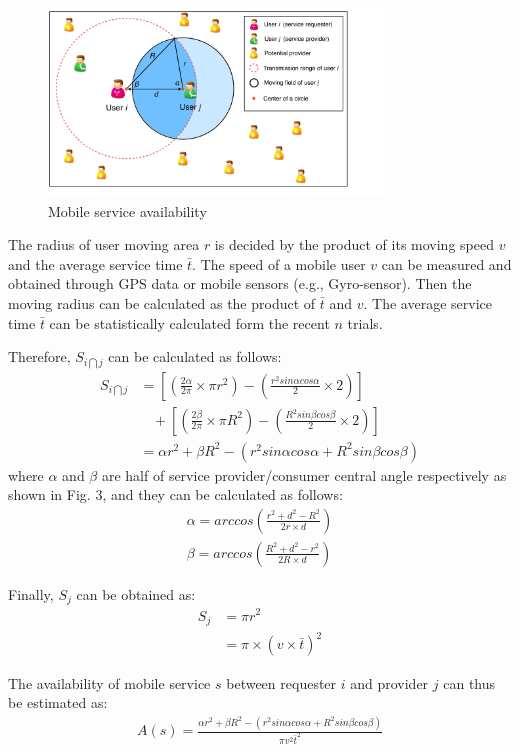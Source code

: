 \documentclass[journal]{IEEEtran}
\begin{document}
\begin{figure}[!t]
\centering
\includegraphics[width=3.5in]{./img/pic3.pdf}
\caption{Mobile service availability}
\label{fig_sd}
\end{figure}

The radius of user moving area $r$ is decided by the product of its moving speed $v$ and the average service time $\bar{t}$. 
The speed of a mobile user $v$ can be measured and obtained through GPS data or mobile sensors (e.g., Gyro-sensor). Then the moving radius can be calculated as the product of $\bar{t}$ and $v$.
The average service time $\bar{t}$ can be statistically calculated form the recent $n$ trials.

Therefore, $S_{i \bigcap j}$ can be calculated as follows:
\begin{align}
S_{i \bigcap j} & =  [(\frac{2\alpha}{2\pi} \times \pi r^2)-(\frac{r^2 sin\alpha cos\alpha}{2} \times 2)]\\\nonumber
& \ \ \ \ +[(\frac{2\beta}{2\pi} \times \pi R^2)-(\frac{R^2 sin\beta cos\beta}{2} \times 2)]\\\nonumber
& = \alpha r^2 + \beta R^2 - (r^2 sin\alpha cos\alpha + R^2 sin\beta cos\beta)
\end{align}
where $\alpha$ and $\beta$ are half of service provider/consumer central angle respectively as shown in Fig. 3, and they can be calculated as follows:
\begin{eqnarray}
\alpha = arccos(\frac{r^2+d^2-R^2}{2r\times d}) \\\nonumber
\beta = arccos(\frac{R^2+d^2-r^2}{2R\times d})
\end{eqnarray}

Finally, $S_j$ can be obtained as:
\begin{align}
S_j & = \pi r^2 \\\nonumber
& = \pi \times (v \times \bar{t})^2
\end{align}

The availability of mobile service $s$ between requester $i$ and provider $j$ can thus be estimated as:
\begin{align}
A(s) = \frac{\alpha r^2 + \beta R^2 - (r^2 sin\alpha cos\alpha + R^2 sin\beta cos\beta)}{\pi v^2 \bar{t}^2}
\end{align}
\end{document}
